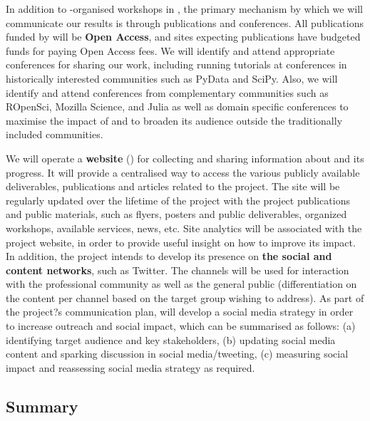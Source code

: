 In addition to \TheProject-organised workshops in
,
the primary mechanism by which we will communicate our results is through publications and conferences.
All publications funded by \TheProject will be \textbf{Open Access},
and sites expecting publications have budgeted funds for paying Open Access fees.
We will identify and attend appropriate conferences for sharing our work,
including running tutorials at conferences in historically interested communities such as PyData and SciPy.
Also, we will identify and attend conferences from complementary communities such as ROpenSci,
Mozilla Science, and Julia
as well as domain specific conferences to maximise the impact of \TheProject and to broaden its
audience outside the
traditionally included communities.

We will operate a \textbf{website}
()
for collecting and sharing information about \TheProject and its progress.
It will provide a centralised way to access the various publicly available deliverables, publications
and articles related
to the project. The site will be regularly updated over the lifetime of the project
with the project publications and public materials, such as flyers, posters and
public deliverables, organized workshops, available services, news, etc.
Site analytics will be associated with the project website, in order
to provide useful insight on how to improve its impact. In addition, the project intends to
develop its presence on \textbf{the social and content
networks}, such as Twitter. The channels will be used for interaction
with the professional community as well as the general public
(differentiation on the content per channel based on the target group wishing to address).
As part of the project?s communication plan, \TheProject will develop a social media strategy
in order to increase outreach and social impact, which can be summarised as follows: (a) identifying target
audience and key stakeholders, (b) updating social media content and sparking
discussion in social media/tweeting, (c) measuring social impact and reassessing
social media strategy as required.

\clearpage
\subsection{Summary}


